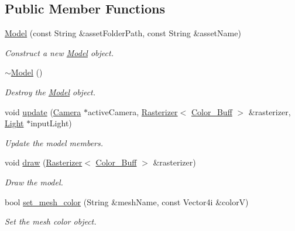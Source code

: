 \subsection*{Public Member Functions}
\begin{DoxyCompactItemize}
\item 
\mbox{\hyperlink{classprzurro_1_1_model_aa25706e59d97214c6e2556f45d19d945}{Model}} (const String \&asset\+Folder\+Path, const String \&asset\+Name)
\begin{DoxyCompactList}\small\item\em Construct a new \mbox{\hyperlink{classprzurro_1_1_model}{Model}} object. \end{DoxyCompactList}\item 
\mbox{\hyperlink{classprzurro_1_1_model_aa364e361f37b8e534bc3b6a66d4f4e4e}{$\sim$\+Model}} ()
\begin{DoxyCompactList}\small\item\em Destroy the \mbox{\hyperlink{classprzurro_1_1_model}{Model}} object. \end{DoxyCompactList}\item 
void \mbox{\hyperlink{classprzurro_1_1_model_a92c773fb7ab51e62cf25ea0c0691886b}{update}} (\mbox{\hyperlink{classprzurro_1_1_camera}{Camera}} $\ast$active\+Camera, \mbox{\hyperlink{classprzurro_1_1_rasterizer}{Rasterizer}}$<$ \mbox{\hyperlink{classprzurro_1_1_color___buffer___rgba8888}{Color\+\_\+\+Buff}} $>$ \&rasterizer, \mbox{\hyperlink{classprzurro_1_1_light}{Light}} $\ast$input\+Light)
\begin{DoxyCompactList}\small\item\em Update the model members. \end{DoxyCompactList}\item 
void \mbox{\hyperlink{classprzurro_1_1_model_acc2f2e7746c7d3a9cec619d103f3889d}{draw}} (\mbox{\hyperlink{classprzurro_1_1_rasterizer}{Rasterizer}}$<$ \mbox{\hyperlink{classprzurro_1_1_color___buffer___rgba8888}{Color\+\_\+\+Buff}} $>$ \&rasterizer)
\begin{DoxyCompactList}\small\item\em Draw the model. \end{DoxyCompactList}\item 
bool \mbox{\hyperlink{classprzurro_1_1_model_a1dee0161257ca282bedd2601dc539d43}{set\+\_\+mesh\+\_\+color}} (String \&mesh\+Name, const Vector4i \&colorV)
\begin{DoxyCompactList}\small\item\em Set the mesh color object. \end{DoxyCompactList}\item 

\end{DoxyCompactItemize}
